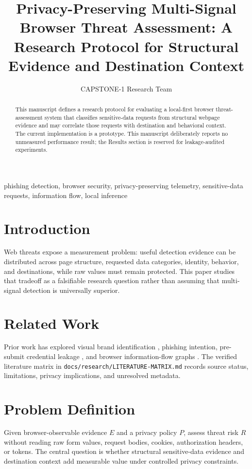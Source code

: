 \documentclass[journal]{IEEEtran}
\title{Privacy-Preserving Multi-Signal Browser Threat Assessment: A Research Protocol for Structural Evidence and Destination Context}
\author{CAPSTONE-1 Research Team}
\begin{document}
\maketitle

\begin{abstract}
This manuscript defines a research protocol for evaluating a local-first browser threat-assessment system that classifies sensitive-data requests from structural webpage evidence and may correlate those requests with destination and behavioral context. The current implementation is a prototype. This manuscript deliberately reports no unmeasured performance result; the Results section is reserved for leakage-audited experiments.
\end{abstract}

\begin{IEEEkeywords}
phishing detection, browser security, privacy-preserving telemetry, sensitive-data requests, information flow, local inference
\end{IEEEkeywords}

\section{Introduction}
Web threats expose a measurement problem: useful detection evidence can be distributed across page structure, requested data categories, identity, behavior, and destinations, while raw values must remain protected. This paper studies that tradeoff as a falsifiable research question rather than assuming that multi-signal detection is universally superior.

\section{Related Work}
Prior work has explored visual brand identification \cite{lin2021phishpedia}, phishing intention, pre-submit credential leakage \cite{senol2022leakyforms}, and browser information-flow graphs \cite{siby2022webgraph}. The verified literature matrix in \texttt{docs/research/LITERATURE-MATRIX.md} records source status, limitations, privacy implications, and unresolved metadata.

\section{Problem Definition}
Given browser-observable evidence $E$ and a privacy policy $P$, assess threat risk $R$ without reading raw form values, request bodies, cookies, authorization headers, or tokens. The central question is whether structural sensitive-data evidence and destination context add measurable value under controlled privacy constraints.
\end{document}
